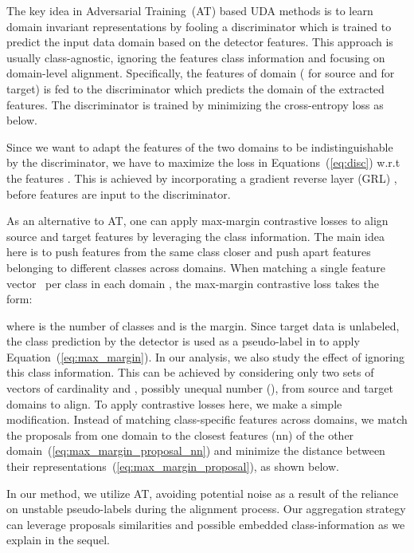\documentclass[10pt,twocolumn,letterpaper]{article}
\DeclareRobustCommand{\eqnref}[1]{Equation~(\ref{#1})}
\DeclareRobustCommand{\eqnsref}[1]{Equations~(\ref{#1})}
\begin{document}
 The key idea in Adversarial Training~(AT) based UDA methods is to learn domain invariant representations by fooling a discriminator which is trained to predict the input data domain based on the detector features. 
This approach is usually class-agnostic, ignoring the features class information and focusing on domain-level alignment. 
Specifically, the features  of domain  ( for source and  for target) is fed to the discriminator  which predicts the domain of the extracted features. 
The discriminator is trained by minimizing the cross-entropy loss as below.

Since we want to adapt the features of the two domains to be indistinguishable by the discriminator, we have to maximize the loss in \eqnsref{eq:disc} w.r.t the features . This is achieved by incorporating a gradient reverse layer (GRL) \cite{grl_ganin}, before features are input to the discriminator.


As an alternative to AT, one can apply max-margin contrastive losses to align source and target features by leveraging the class information.
The main idea here is to push features from the same class closer and push apart features belonging to different classes across domains.
When matching a single feature vector ~per class  in each domain , the max-margin contrastive loss takes the form: 
\small

\normalsize
where  is the number of classes and  is the margin.  
Since target data is unlabeled, the class prediction by the detector is used as a pseudo-label in \cite{GPA} to apply \eqnref{eq:max_margin}.
In our analysis, we also study the effect of ignoring this class information. 
This can be achieved by considering only two sets of vectors of cardinality  and , possibly unequal number (), from source and target domains to align.  
To apply contrastive losses here, we make a simple modification. 
Instead of matching class-specific features across domains, we match the proposals from one domain to the closest features (nn) of the other domain~(\ref{eq:max_margin_proposal_nn}) and minimize the distance between their representations~(\ref{eq:max_margin_proposal}), as shown below.
\begin{small}
	
\end{small}
In our method, we utilize AT, avoiding  potential noise as a result of the reliance on unstable pseudo-labels during the alignment process. Our  aggregation strategy can leverage proposals similarities and possible embedded class-information as we explain in the sequel. 
\end{document}
